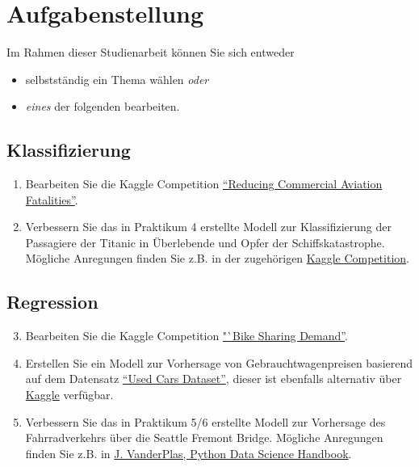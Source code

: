 \documentclass[11pt,a4paper]{article}
\begin{document}
\sffamily
\header[Studienarbeit]


\section*{Aufgabenstellung}
Im Rahmen dieser Studienarbeit können Sie sich entweder 
\begin{itemize}
	\item selbstständig ein Thema wählen \emph{oder}
	\item \emph{eines} der folgenden bearbeiten.
\end{itemize}

\subsection*{Klassifizierung}
	\begin{enumerate}
		\item Bearbeiten Sie die Kaggle Competition \href{https://www.kaggle.com/c/reducing-commercial-aviation-fatalities}{"`Reducing Commercial Aviation Fatalities"'}.
		\item Verbessern Sie das in Praktikum 4 erstellte Modell zur Klassifizierung der Passagiere der Titanic in Überlebende und Opfer der Schiffskatastrophe. Mögliche Anregungen finden Sie z.B. in der zugehörigen \href{https://www.kaggle.com/c/titanic}{Kaggle Competition}.
	\end{enumerate}
\subsection*{Regression}
	\begin{enumerate}
		\setcounter{enumi}{2}
		\item Bearbeiten Sie die Kaggle Competition \href{https://www.kaggle.com/c/bike-sharing-demand}{"`Bike Sharing Demand''}.
		\item Erstellen Sie ein Modell zur Vorhersage von Gebrauchtwagenpreisen basierend auf dem Datensatz \href{https://syncandshare.lrz.de/dl/fiAzFNmK5f5d9ftPZHeaC2d/vehicles.csv.zip}{"`Used Cars Dataset"'}, dieser ist ebenfalls alternativ über \href{https://www.kaggle.com/austinreese/craigslist-carstrucks-data}{Kaggle} verfügbar.
		\item Verbessern Sie das in Praktikum 5/6 erstellte Modell zur Vorhersage des Fahrradverkehrs über die Seattle Fremont Bridge. Mögliche Anregungen finden Sie z.B. in \href{https://jakevdp.github.io/PythonDataScienceHandbook/05.06-linear-regression.html}{J. VanderPlas, Python Data Science Handbook}.
	\end{enumerate}
\end{document}
